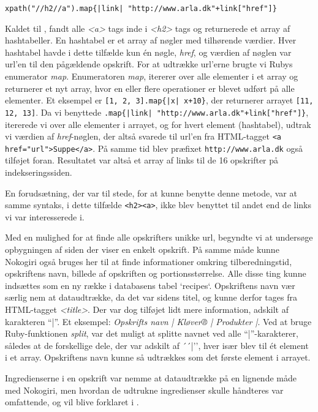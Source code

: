 \texttt{xpath("//h2//a").map\{|link| "http://www.arla.dk"+link["href"]\}}

Kaldet til , fandt alle \textit{<a>} tags inde i \textit{<h2>} tags og returnerede et array af hashtabeller. En hashtabel er et array af nøgler med tilhørende værdier. Hver hashtabel havde i dette tilfælde kun én nøgle, \textit{href}, og værdien af nøglen var url'en til den pågældende opskrift. For at udtrække url'erne brugte vi Rubys enumerator \textit{map}. Enumeratoren \textit{map}, itererer over alle elementer i et array og returnerer et nyt array, hvor en eller flere operationer er blevet udført på alle elementer\cite{rubydoc}. Et eksempel er \texttt{[1, 2, 3].map\{|x| x+10\}}, der returnerer arrayet \texttt{[11, 12, 13]}. Da vi benyttede \texttt{.map\{|link| "http://www.arla.dk"+link["href"]\}}, itererede vi over alle elementer i arrayet, og for hvert element (hashtabel), udtrak vi værdien af \textit{href}-nøglen, der altså svarede til url'en fra HTML-tagget \texttt{<a href="url">Suppe</a>}. På samme tid blev præfixet \texttt{http://www.arla.dk} også tilføjet foran. Resultatet var altså et array af links til de 16 opskrifter på indekseringssiden.

En forudsætning, der var til stede, for at kunne benytte denne metode, var at samme syntaks, i dette tilfælde \lstinline{<h2><a>}, ikke blev benyttet til andet end de links vi var interesserede i.

Med en mulighed for at finde alle opskrifters unikke url, begyndte vi at undersøge opbygningen af siden der viser en enkelt opskrift.
På samme måde kunne Nokogiri også bruges her til at finde informationer omkring tilberedningstid, opskriftens navn, billede af opskriften og portionsstørrelse. Alle disse ting kunne indsættes som en ny række i databasens tabel `recipes`. Opskriftens navn vær særlig nem at dataudtrække, da det var sidens titel, og kunne derfor tages fra HTML-tagget \textit{<title>}. Der var dog tilføjet lidt mere information, adskilt af karakteren ``|''. Et eksempel: \textit{Opskrifts navn | Kløver® | Produkter |}. Ved at bruge Ruby-funktionen \textit{split}\cite{rubydoc}, var det muligt at splitte navnet ved alle ``|''-karakterer, således at de forskellige dele, der var adskilt af ´´|'', hver især blev til ét element i et array. Opskriftens navn kunne så udtrækkes som det første element i arrayet.

Ingredienserne i en opskrift var nemme at dataudtrække på en lignende måde med Nokogiri, men hvordan de udtrukne ingredienser skulle håndteres var omfattende, og vil blive forklaret i .

